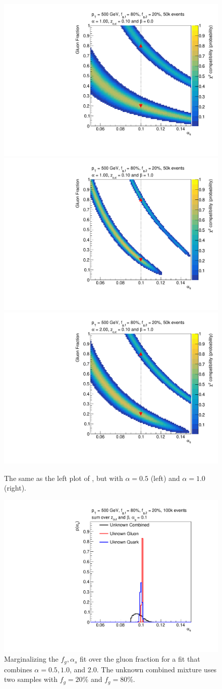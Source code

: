 \begin{figure}[t]
\begin{center}
\includegraphics[width = 0.49\columnwidth]{figures/banana_alpha_10beta_0_zcut_123451324.pdf}\includegraphics[width = 0.49\columnwidth]{figures/banana_alpha_10beta_10_zcut_123451324.pdf}\\\includegraphics[width = 0.49\columnwidth]{figures/banana_alpha_20beta_10_zcut_123451324.pdf}
\end{center}
\caption{The same as the left plot of , but with $\alpha=0.5$ (left) and $\alpha=1.0$ (right).}
\label{fig:morebananas}
\end{figure}

\begin{figure}[t]
\begin{center}
\includegraphics[width = 0.49\columnwidth]{figures/combination23451324.pdf}
\end{center}
\caption{Marginalizing the $f_g,\alpha_s$ fit over the gluon fraction for a fit that combines $\alpha=0.5, 1.0$, and $2.0$.  The unknown combined mixture uses two samples with $f_g=20\%$ and $f_g=80\%$.}
\label{fig:combo}
\end{figure}

